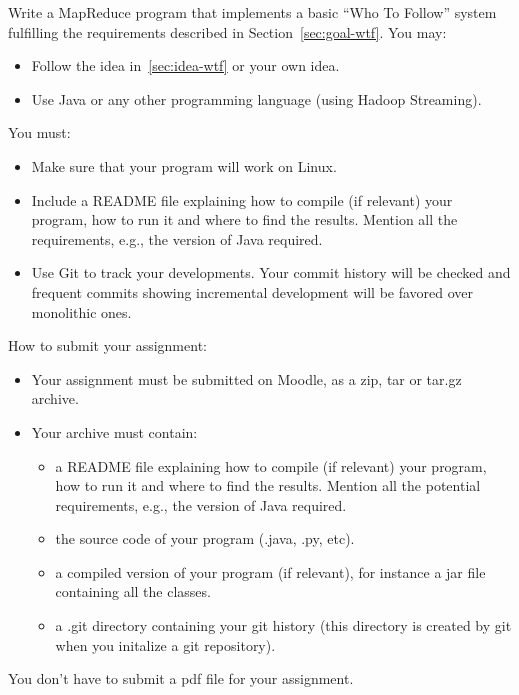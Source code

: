 \documentclass[11pt]{article}
\begin{document}
Write a MapReduce program that implements a basic ``Who To Follow'' system
fulfilling the requirements described in Section~\ref{sec:goal-wtf}. You may:
\begin{itemize}
\item Follow the
  idea in~\ref{sec:idea-wtf} or your own idea.
\item Use Java or any other programming language (using Hadoop
  Streaming).
\end{itemize}
You must:
\begin{itemize}
\item Make sure that your program will work on Linux.
\item Include a README file explaining how to compile (if relevant)
  your program, how to run it and where to find the results. Mention all the
  requirements, e.g., the version of Java required.
\item Use Git to track your developments. Your commit history will be
  checked and frequent commits showing incremental development will be
  favored over monolithic ones.
\end{itemize}
How to submit your assignment:
\begin{itemize}
\item Your assignment must be submitted on Moodle, as a zip, tar or tar.gz archive.
\item Your archive must contain:
  \begin{itemize}
  \item a README file explaining how to compile (if relevant) your
    program, how to run it and where to find the results. Mention all
    the potential requirements, e.g., the version of Java required.
  \item the source code of your program (.java, .py, etc).
  \item a compiled version of your program (if relevant), for instance
    a jar file containing all the classes.
  \item a .git directory containing your git history (this directory
    is created by git when you initalize a git repository).
  \end{itemize}
\end{itemize}
You don't have to submit a pdf file for your assignment.
\end{document}
